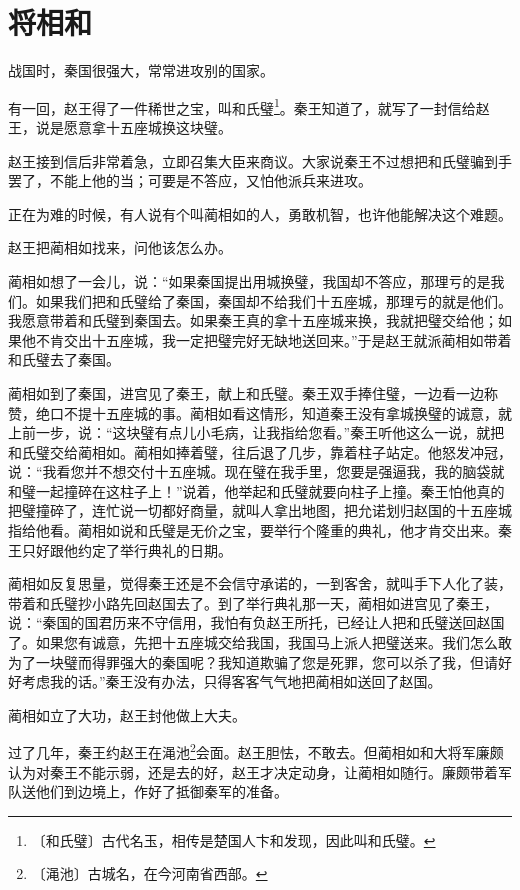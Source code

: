 \documentclass[12pt,UTF-8,openany]{ctexbook}
\begin{document}
\chapter{将相和}

\begin{large}
    
    战国时，秦国很强大，常常进攻别的国家。
    
    有一回，赵王得了一件稀世之宝，叫和氏璧\footnote{〔和氏璧〕古代名玉，相传是楚国人卞和发现，因此叫和氏璧。}。秦王知道了，就写了一封信给赵王，说是愿意拿十五座城换这块璧。
    
    赵王接到信后非常着急，立即召集大臣来商议。大家说秦王不过想把和氏璧骗到手罢了，不能上他的当；可要是不答应，又怕他派兵来进攻。
    
    正在为难的时候，有人说有个叫蔺相如的人，勇敢机智，也许他能解决这个难题。
    
    赵王把蔺相如找来，问他该怎么办。
    
    蔺相如想了一会儿，说：“如果秦国提出用城换璧，我国却不答应，那理亏的是我们。如果我们把和氏璧给了秦国，秦国却不给我们十五座城，那理亏的就是他们。我愿意带着和氏璧到秦国去。如果秦王真的拿十五座城来换，我就把璧交给他；如果他不肯交出十五座城，我一定把璧完好无缺地送回来。”于是赵王就派蔺相如带着和氏璧去了秦国。
    
    蔺相如到了秦国，进宫见了秦王，献上和氏璧。秦王双手捧住璧，一边看一边称赞，绝口不提十五座城的事。蔺相如看这情形，知道秦王没有拿城换璧的诚意，就上前一步，说：“这块璧有点儿小毛病，让我指给您看。”秦王听他这么一说，就把和氏璧交给蔺相如。蔺相如捧着璧，往后退了几步，靠着柱子站定。他怒发冲冠，说：“我看您并不想交付十五座城。现在璧在我手里，您要是强逼我，我的脑袋就和璧一起撞碎在这柱子上！”说着，他举起和氏璧就要向柱子上撞。秦王怕他真的把璧撞碎了，连忙说一切都好商量，就叫人拿出地图，把允诺划归赵国的十五座城指给他看。蔺相如说和氏璧是无价之宝，要举行个隆重的典礼，他才肯交出来。秦王只好跟他约定了举行典礼的日期。
    
    蔺相如反复思量，觉得秦王还是不会信守承诺的，一到客舍，就叫手下人化了装，带着和氏璧抄小路先回赵国去了。到了举行典礼那一天，蔺相如进宫见了秦王，说：“秦国的国君历来不守信用，我怕有负赵王所托，已经让人把和氏璧送回赵国了。如果您有诚意，先把十五座城交给我国，我国马上派人把璧送来。我们怎么敢为了一块璧而得罪强大的秦国呢？我知道欺骗了您是死罪，您可以杀了我，但请好好考虑我的话。”秦王没有办法，只得客客气气地把蔺相如送回了赵国。
    
    蔺相如立了大功，赵王封他做上大夫。
    
    过了几年，秦王约赵王在渑池\footnote{〔渑池〕古城名，在今河南省西部。}会面。赵王胆怯，不敢去。但蔺相如和大将军廉颇认为对秦王不能示弱，还是去的好，赵王才决定动身，让蔺相如随行。廉颇带着军队送他们到边境上，作好了抵御秦军的准备。
    

\end{large}
\end{document}
